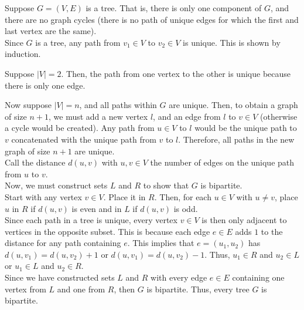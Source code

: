 \documentclass[12pt]{article}
\begin{document}
\begin{enumerate}
\begin{enumerate}
             Suppose $G = (V, E)$ is a tree. That is, there is only one component of $G$, and there are no graph cycles (there is no path of unique edges for which the first and last vertex are the same).\\
             
             Since $G$ is a tree, any path from $v_1 \in V$ to $v_2 \in V$ is unique. This is shown by induction.
             
             Suppose $|V|=2$. Then, the path from one vertex to the other is unique because there is only one edge.
             
             Now suppose $|V|=n$, and all paths within $G$ are unique. Then, to obtain a graph of size $n+1$, we must add a new vertex $l$, and an edge from $l$ to $v\in V$ (otherwise a cycle would be created). Any path from $u\in V$ to $l$ would be the unique path to $v$ concatenated with the unique path from $v$ to $l$. Therefore, all paths in the new graph of size $n+1$ are unique.\\
             
             Call the distance $d(u,v)$ with $u,v\in V$ the number of edges on the unique path from $u$ to $v$.\\
             
             Now, we must construct sets $L$ and $R$ to show that $G$ is bipartite.\\
             
             Start with any vertex $v \in V$. Place it in $R$. Then, for each $u\in V$ with $u\neq v$, place $u$ in $R$ if $d(u,v)$ is even and in $L$ if $d(u,v)$ is odd.\\
             
             Since each path in a tree is unique, every vertex $v \in V$ is then only adjacent to vertices in the opposite subset. This is because each edge $e \in E$ adds $1$ to the distance for any path containing $e$. This implies that $e=(u_1, u_2)$ has $d(u,v_1) = d(u,v_2) + 1$ or $d(u,v_1) = d(u,v_2) - 1$. Thus, $u_1 \in R$ and $u_2 \in L$ or $u_1 \in L$ and $u_2 \in R$.\\
             
             Since we have constructed sets $L$ and $R$ with every edge $e\in E$ containing one vertex from $L$ and one from $R$, then $G$ is bipartite. Thus, every tree $G$ is bipartite.\\
            \begin{center}
\end{center}
\end{enumerate}
\end{enumerate}
\end{document}
